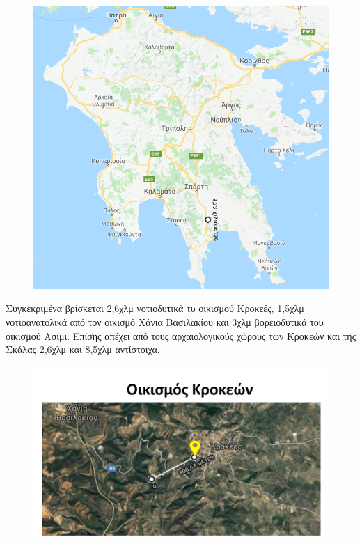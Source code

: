 \documentclass[12pt]{article}
\begin{document}
	\begin{figure} [H]
		\begin{center}
			\includegraphics [scale = 0.45] {map23.png}
		\end{center}
	\end{figure}
	
	Συγκεκριμένα βρίσκεται 2,6χλμ νοτιοδυτικά τυ οικισμού Κροκεές, 1,5χλμ νοτιοανατολικά από τον οικισμό Χάνια Βασιλακίου και 3χλμ βορειοδυτικά του οικισμού Ασίμι. Επίσης απέχει από τους αρχαιολογικούς χώρους των Κροκεών και της Σκάλας 2,6χλμ και 8,5χλμ αντίστοιχα.
		
	\begin{figure} [H]
		\begin{center}
			\includegraphics [scale = 0.55] {map24.png}
		\end{center}
	\end{figure}
\end{document}
